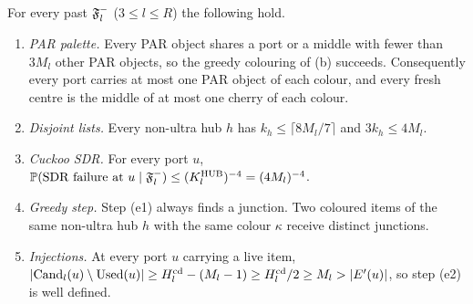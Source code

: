 \begin{lemma}\label{s7:lemWellDef}
For every past $\mathfrak{F}^{-}_l$ ($3\le l\le R$) the following hold.
\begin{enumerate}
\item[(i)] \emph{PAR palette.} Every PAR object shares a port or a middle with
fewer than $3M_l$ other PAR objects, so the greedy colouring of (b) succeeds.
Consequently every port carries at most one PAR object of each colour, and
every fresh centre is the middle of at most one cherry of each colour.
\item[(ii)] \emph{Disjoint lists.} Every non-ultra hub $h$ has
$k_h\le\lceil8M_l/7\rceil$ and $3k_h\le4M_l$.
\item[(iii)] \emph{Cuckoo SDR.} For every port $u$,
$\mathbb{P}(\text{SDR failure at }u\mid\mathfrak{F}^{-}_l)\le(K^{\mathrm{HUB}}_l)^{-4}=(4M_l)^{-4}$.
\item[(iv)] \emph{Greedy step.} Step (e1) always finds a junction. Two coloured
items of the same non-ultra hub $h$ with the same colour $\kappa$ receive
distinct junctions.
\item[(v)] \emph{Injections.} At every port $u$ carrying a live item,
$|\mathrm{Cand}_l(u)\setminus\mathrm{Used}(u)|\ge H^{\mathrm{cd}}_l-(M_l-1)\ge H^{\mathrm{cd}}_l/2\ge M_l>|E'(u)|$, so
step (e2) is well defined.
\end{enumerate}
\deps{\ref{s7:consRound}, \ref{s6:lemJplus}, \ref{s7:lemCand}, \ref{s3:lemCOLJV}, \ref{s1:citHall}, \ref{s2:defHBtp}}
\end{lemma}

